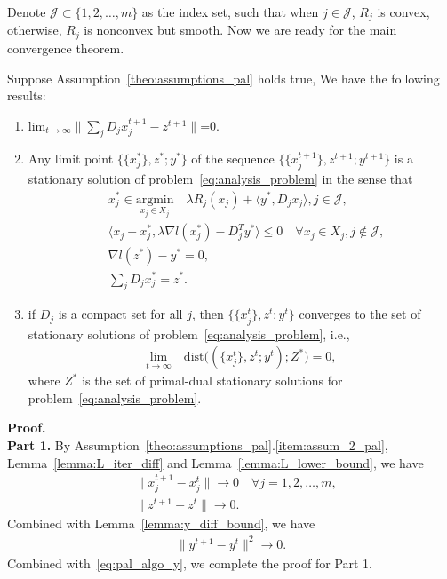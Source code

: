 Denote $\mathcal{J}\subset\{1,2,\ldots, m\}$ as the index set, such that when $ j\in\mathcal{J}$, $R_j$ is convex, otherwise, $R_j$ is nonconvex but smooth. Now we are ready for the main convergence theorem. 
\begin{theorem}\label{theo:convergence}
Suppose Assumption~\ref{theo:assumptions_pal} holds true, We have the following results:
\begin{enumerate}
    \item $\text{lim}_{t\rightarrow\infty}\|\sum_j D_jx_j^{t+1} - z^{t+1}\|$=0.\label{item:primal_cond_limit}
    \item Any limit point $\{\{x_j^*\}, z^*; y^*\}$ of the sequence $\{\{x_j^{t+1}\}, z^{t+1}; y^{t+1}\}$ is a stationary solution of problem~\eqref{eq:analysis_problem} in the sense that
    \begin{align}
        & x_j^* \in \underset{x_j\in X_j}{\text{argmin}}\quad \lambda R_j(x_j) + \langle y^*, D_jx_j\rangle, j\in\mathcal{J},\label{eq:cond_x_opt_conv}\\
        & \langle x_j - x_j^*, \lambda\nabla l(x_j^*) - D_j^T y^* \rangle\le 0\quad\forall x_j\in X_j, j\not\in\mathcal{J}, \label{eq:cond_x_opt_nonconv}\\
        & \nabla l(z^*) - y^* = 0,\label{eq:cond_dual}\\
        & \sum_jD_jx_j^* = z^*.\label{eq:cond_primal}
    \end{align}
    \item if $D_j$ is a compact set for all $j$, then $\{\{x_j^t\}, z^t; y^t\}$ converges to the set of stationary solutions of problem~\eqref{eq:analysis_problem}, i.e., 
    \begin{align}
        \underset{t\rightarrow\infty}{\text{lim}}\quad\text{dist}\big((\{x_j^t\}, z^t; y^t);Z^*\big) = 0,\nonumber
    \end{align}
    where $Z^*$ is the set of primal-dual stationary solutions for problem~\eqref{eq:analysis_problem}.
\end{enumerate}
\end{theorem}

{\bf Proof.} \\
{\bf Part 1. } By Assumption~\ref{theo:assumptions_pal}.\ref{item:assum_2_pal}, Lemma~\ref{lemma:L_iter_diff} and Lemma~\ref{lemma:L_lower_bound}, we have 
\begin{align}
    & \|x_j^{t+1} - x_j^t\|\rightarrow 0\quad\forall j=1,2,\ldots, m,\nonumber\\
    & \|z^{t+1} - z^t\|\rightarrow 0.\nonumber
\end{align}
Combined with Lemma~\ref{lemma:y_diff_bound}, we have 
\begin{align}
    \|y^{t+1}-y^t\|^2\rightarrow 0.\nonumber
\end{align}
Combined with~\eqref{eq:pal_algo_y}, we complete the proof for Part 1. 

